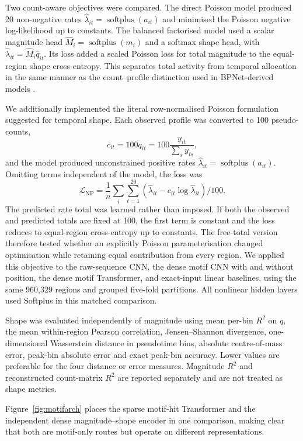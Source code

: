\documentclass[a4paper,12pt]{article}
\begin{document}
Two count-aware objectives were compared. The direct Poisson model produced 20 non-negative rates $\widehat\lambda_{it}=\operatorname{softplus}(a_{it})$ and minimised the Poisson negative log-likelihood up to constants. The balanced factorised model used a scalar magnitude head $\widehat M_i=\operatorname{softplus}(m_i)$ and a softmax shape head, with $\widehat\lambda_{it}=\widehat M_i\widehat q_{it}$. Its loss added a scaled Poisson loss for total magnitude to the equal-region shape cross-entropy. This separates total activity from temporal allocation in the same manner as the count--profile distinction used in BPNet-derived models \citep{avsec2021bpnet,pampari2025chrombpnet}.

We additionally implemented the literal row-normalised Poisson formulation suggested for temporal shape. Each observed profile was converted to 100 pseudo-counts,
\[
c_{it}=100q_{it}=100\frac{y_{it}}{\sum_s y_{is}},
\]
and the model produced unconstrained positive rates $\widehat\lambda_{it}=\operatorname{softplus}(a_{it})$. Omitting terms independent of the model, the loss was
\[
\mathcal L_{\mathrm{NP}}
=\frac{1}{n}\sum_i\sum_{t=1}^{20}
\left(\widehat\lambda_{it}-c_{it}\log\widehat\lambda_{it}\right)/100.
\]
The predicted rate total was learned rather than imposed. If both the observed and predicted totals are fixed at 100, the first term is constant and the loss reduces to equal-region cross-entropy up to constants. The free-total version therefore tested whether an explicitly Poisson parameterisation changed optimisation while retaining equal contribution from every region. We applied this objective to the raw-sequence CNN, the dense motif CNN with and without position, the dense motif Transformer, and exact-input linear baselines, using the same 960,329 regions and grouped five-fold partitions. All nonlinear hidden layers used Softplus in this matched comparison.

Shape was evaluated independently of magnitude using mean per-bin $R^2$ on $q$, the mean within-region Pearson correlation, Jensen--Shannon divergence, one-dimensional Wasserstein distance in pseudotime bins, absolute centre-of-mass error, peak-bin absolute error and exact peak-bin accuracy. Lower values are preferable for the four distance or error measures. Magnitude $R^2$ and reconstructed count-matrix $R^2$ are reported separately and are not treated as shape metrics.

Figure~\ref{fig:motifarch} places the sparse motif-hit Transformer and the independent dense magnitude--shape encoder in one comparison, making clear that both are motif-only routes but operate on different representations.
\end{document}
